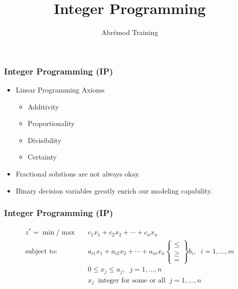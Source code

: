 \documentclass[12pt,handout]{beamer}
\title{Integer Programming}
\author{Abr\'emod Training}
\begin{document}

\begin{frame}
\titlepage
\end{frame}

\begin{frame}
\frametitle{Integer Programming (IP)}
\begin{itemize}
\item Linear Programming Axioms
\begin{itemize}
\item Additivity
\item Proportionality
\item {\color{red} Divisibility}
\item Certainty
\end{itemize}
\item Fractional solutions are not always okay.
\item Binary decision variables greatly enrich our modeling capability.
\end{itemize}
\end{frame}

\begin{frame}
\frametitle{Integer Programming (IP)}
\begin{eqnarray}
z^* = \min / \max && c_1 x_1 + c_2 x_2 + \cdots + c_n x_n \nonumber \\
\mbox{subject to:} &&a_{i1} x_1 + a_{i2} x_2 + \cdots + a_{in} x_n
\begin{Bmatrix}   \le \\
                   \ge \\
                    =
\end{Bmatrix}
b_i,\;\;i = 1,\ldots,m \nonumber \\
&&0 \le x_j \le u_j,\;\;j = 1,\ldots,n \nonumber \\
&&x_j \;\;\mbox{integer for some or all}\;\; j = 1,\ldots,n \nonumber
\end{eqnarray}
\end{frame}
\end{document}
